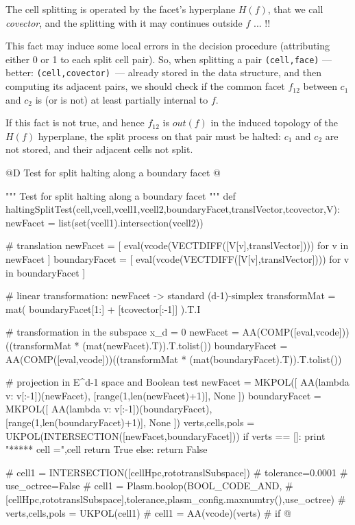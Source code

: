 \documentclass[11pt,oneside]{article}	%
\begin{document}
The cell splitting is operated by the facet's hyperplane $H(f)$, that we call \emph{covector},  and the splitting with it may continues outside $f$ ... !!

This fact may induce some local errors in the decision procedure (attributing either 0 or 1 to each split cell pair).
So, when splitting a pair \texttt{(cell,face)} --- better: \texttt{(cell,covector) }--- already stored in the data structure, and then computing its adjacent  pairs,
we should check if the common facet $f_{12}$ between $c_1$ and $c_2$ is (or is not) at least partially internal  to $f$.  

If this fact is not true, and hence $f_{12}$ is $out(f)$  in the induced topology of the $H(f)$ hyperplane, the split process on that pair must be halted:  $c_1$ and $c_2$ are not stored, and their adjacent cells not split.


@D Test for split halting along a boundary facet
@{""" Test for split halting along a boundary facet """
def haltingSplitTest(cell,vcell,vcell1,vcell2,boundaryFacet,translVector,tcovector,V):
	newFacet = list(set(vcell1).intersection(vcell2))
	
	# translation 
	newFacet = [ eval(vcode(VECTDIFF([V[v],translVector]))) for v in newFacet ]
	boundaryFacet = [ eval(vcode(VECTDIFF([V[v],translVector]))) for v in boundaryFacet ]
	
	# linear transformation: newFacet -> standard (d-1)-simplex
	transformMat = mat( boundaryFacet[1:] + [tcovector[:-1]] ).T.I
	
	# transformation in the subspace x_d = 0
	newFacet = AA(COMP([eval,vcode]))((transformMat * (mat(newFacet).T)).T.tolist())
	boundaryFacet = AA(COMP([eval,vcode]))((transformMat * (mat(boundaryFacet).T)).T.tolist())
	
	# projection in E^{d-1} space and Boolean test
	newFacet = MKPOL([ AA(lambda v: v[:-1])(newFacet), [range(1,len(newFacet)+1)], None ])
	boundaryFacet = MKPOL([ AA(lambda v: v[:-1])(boundaryFacet), [range(1,len(boundaryFacet)+1)], None ])
	verts,cells,pols = UKPOL(INTERSECTION([newFacet,boundaryFacet]))
	if verts == []: 
		print "\n****** cell =",cell
		return True
	else: return False

# cell1 = INTERSECTION([cellHpc,rototranslSubspace])
# tolerance=0.0001
# use_octree=False
# cell1 = Plasm.boolop(BOOL_CODE_AND, 
# 	[cellHpc,rototranslSubspace],tolerance,plasm_config.maxnumtry(),use_octree)
# verts,cells,pols = UKPOL(cell1)
# cell1 = AA(vcode)(verts)
# if 
@}
\end{document}
